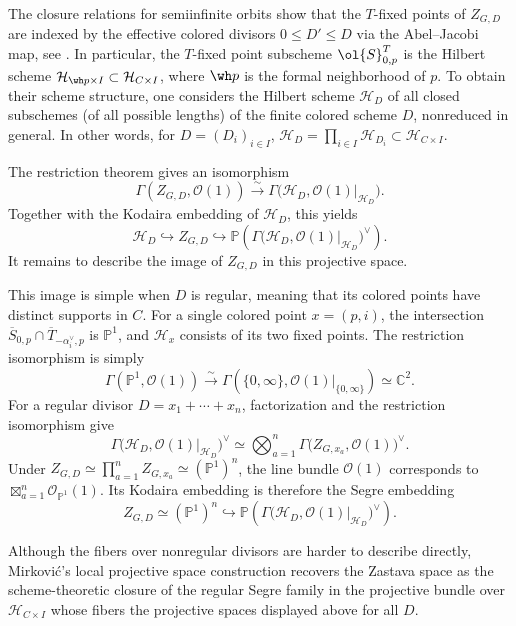 \documentclass{amsart}
\numberwithin{equation}{section}
\numberwithin{figure}{section}
\theoremstyle{definition}
\theoremstyle{remark}
\renewcommand{\c}[1]{\mathcal{#1}}
\renewcommand{\b}[1]{\mathbb{#1}}
\begin{document}
The closure relations for
semiinfinite orbits show that the $T$-fixed points of $ Z_{G,D}$ are
indexed by the effective colored divisors $0\leq D'\leq D$ via the Abel--Jacobi map, see \cite[\S2.2.3]{mirkovic2021loop}. In particular, the $T$-fixed point subscheme $\ol{S}_{0,p}^T$ is the Hilbert scheme $\c H_{\wh p\times I}\subset \c H_{C\times I}$, where $\wh p$ is the formal neighborhood of $p$.
To obtain their scheme structure, one considers the Hilbert scheme
$\mathcal H_D$ of all closed subschemes (of all possible lengths) of the finite colored scheme $D$, nonreduced in general. In other words, for $D=(D_i)_{i\in I}$, $\mathcal H_D=\prod_{i\in I}\mathcal H_{D_i}\subset \mathcal H_{C\times I}$. 


The restriction theorem \cite[\S2.4.6]{mirkovic2021loop} gives an isomorphism
\[
\Gamma(Z_{G,D},\mathcal O(1))
\xrightarrow{\sim}
\Gamma\bigl(\mathcal H_D,\mathcal O(1)|_{\mathcal H_D}\bigr).
\]
Together with the Kodaira embedding of $\mathcal H_D$, this yields
\[
\mathcal H_D
\hookrightarrow Z_{G,D}
\hookrightarrow
\mathbb P\!\left(
\Gamma\bigl(\mathcal H_D,\mathcal O(1)|_{\mathcal H_D}\bigr)^\vee
\right).
\]
It remains to describe the image of $Z_{G,D}$ in this projective space.

This image is simple when $D$ is regular, meaning that its colored
points have distinct supports in $C$. For a single
colored point $x=(p,i)$, the intersection
$\overline S_{0,p}\cap\overline T_{-\alpha_i^\vee,p}$ is
$\mathbb P^1$, and $\mathcal H_x$ consists of its two fixed points.
The restriction
isomorphism is simply
\[
\Gamma(\mathbb P^1,\mathcal O(1))
\xrightarrow{\sim}
\Gamma\!\left(
\{0,\infty\},
\mathcal O(1)|_{\{0,\infty\}}
\right)\simeq \b C^2.
\]
For a regular divisor $D=x_1+\cdots+x_n$, factorization and
the restriction isomorphism give
\[
\Gamma\bigl(\mathcal H_D,\mathcal O(1)|_{\mathcal H_D}\bigr)^\vee
\simeq
\bigotimes_{a=1}^n
\Gamma\bigl(Z_{G,x_a},\mathcal O(1)\bigr)^\vee.
\]
Under $Z_{G,D}\simeq\prod_{a=1}^n Z_{G,x_a}\simeq(\mathbb P^1)^n$,
the line bundle $\mathcal O(1)$ corresponds to
$\boxtimes_{a=1}^n\mathcal O_{\mathbb P^1}(1)$.
Its Kodaira embedding is therefore the Segre embedding
\[
Z_{G,D}\simeq(\mathbb P^1)^n
\hookrightarrow
\mathbb P\!\left(
\Gamma\bigl(\mathcal H_D,\mathcal O(1)|_{\mathcal H_D}\bigr)^\vee
\right).
\]

Although the fibers over nonregular divisors are harder to describe
directly, Mirkovi\'c's local projective space construction recovers
the Zastava space as the scheme-theoretic closure of
the regular Segre family in the projective bundle over
$\mathcal H_{C\times I}$ whose fibers the projective spaces
 displayed above for all $D$.
\end{document}
